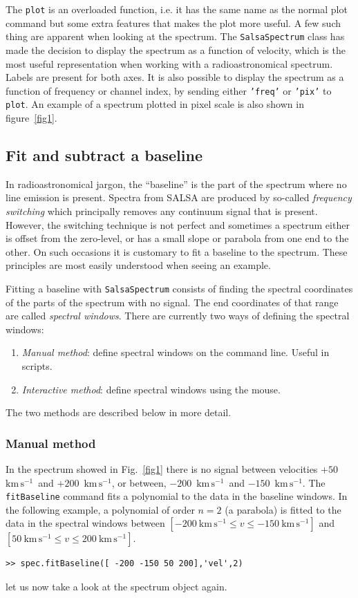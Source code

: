 \documentclass[11pt,a4paper]{article}
\newcommand\kms{$\mathrm{km} \, \mathrm{s}^{-1}$}
\newcommand\kmsmath{\mathrm{km} \, \mathrm{s}^{-1}}
\begin{document}
\noindent
The \texttt{plot} is an overloaded function, i.e. it has the same name
as the normal plot command but some extra features that makes the plot
more useful. A few such thing are apparent when looking at the
spectrum. The \texttt{SalsaSpectrum} class has made the decision to
display the spectrum as a function of velocity, which is the most
useful representation when working with a radioastronomical spectrum.
Labels are present for both axes. It is also possible to display the
spectrum as a function of frequency or channel index, by sending
either \texttt{'freq'} or \texttt{'pix'} to \texttt{plot}. An example
of a spectrum plotted in pixel scale is also shown in
figure~\ref{fig1}.

\subsection{Fit and subtract a baseline}
\label{sec:subtract-baseline}

In radioastronomical jargon, the ``baseline'' is the part of the
spectrum where no line emission is present. Spectra from SALSA are
produced by so-called \emph{frequency switching} which principally
removes any continuum signal that is present. However, the switching
technique is not perfect and sometimes a spectrum either is offset
from the zero-level, or has a small slope or parabola from one end to the
other. On such occasions it is customary to fit a baseline to the
spectrum. These principles are most easily understood when seeing an
example.

Fitting a baseline with \texttt{SalsaSpectrum} consists of finding the
spectral coordinates of the parts of the spectrum with no signal. The
end coordinates of that range are called \emph{spectral
  windows}. There are currently two ways of defining the spectral windows:
\begin{enumerate}
\item \emph{Manual method}: define spectral windows on the command
  line. Useful in scripts.
\item \emph{Interactive method}: define spectral windows using the
  mouse. 
\end{enumerate}
The two methods are described below in more detail.

\subsubsection{Manual method}
\label{sec:manual-method}

In the spectrum showed in Fig.~\ref{fig1} there is no signal between
velocities $+50$~\kms~and $+200$~\kms, or between, $-200$~\kms~and 
$-150$~\kms. The \texttt{fitBaseline}
command fits a polynomial to the data in the baseline windows. In the
following example, a polynomial of order $n=2$ (a parabola) is
fitted to the data in the spectral windows between $[-200~\kmsmath
\leq {v} \leq -150~\kmsmath]$ and $\left[ 50~\kmsmath \leq {v} \leq
  200~\kmsmath \right]$.
\begin{lstlisting}
>> spec.fitBaseline([ -200 -150 50 200],'vel',2)
\end{lstlisting}
\noindent
let us now take a look at the spectrum object again. 
\end{document}

